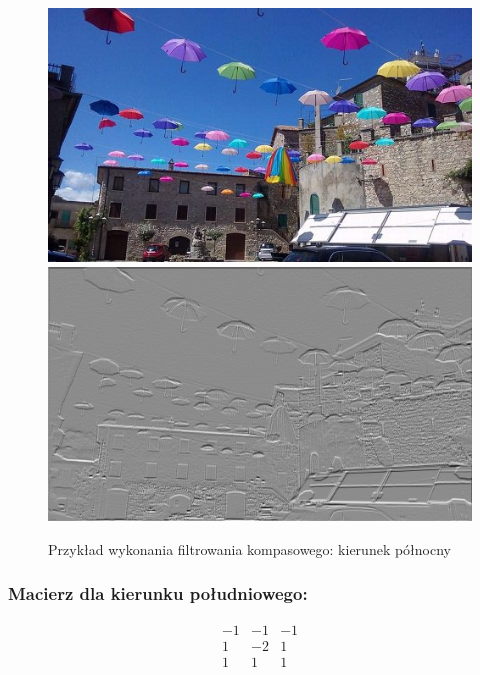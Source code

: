 \documentclass{article}
\begin{document}
	\begin{figure}[!ht]	
	\centering	
	\includegraphics[scale=1.2]{img/rgb-obraz1}
	\includegraphics[scale=1.2]{img/filtrowanie/gray-gradientowekompasowe-polnoc}
	\caption{Przykład wykonania filtrowania kompasowego: kierunek północny}
	\label{fig16}	
	\end{figure}	
	
	\subsubsection{Macierz dla kierunku południowego:}
	\begin{equation*}
	\begin{matrix}
	-1 & -1 & -1 \\
	1 & -2 & 1 \\
	1 & 1 & 1
	\end{matrix}
	\end{equation*}
		
\end{document}
